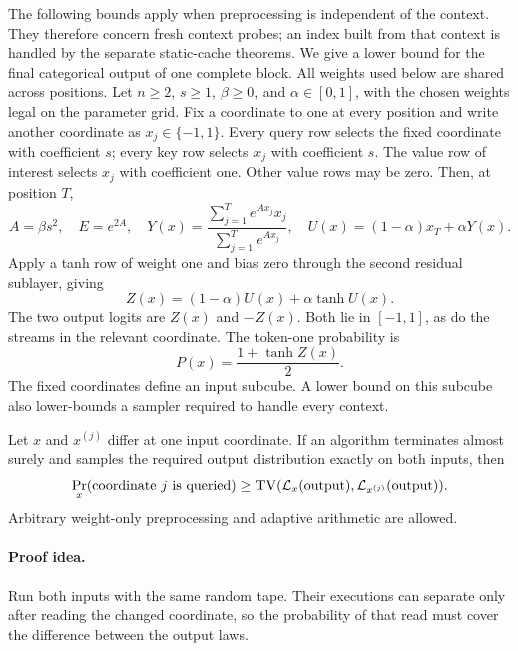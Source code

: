 The following bounds apply when preprocessing is independent of the
context. They therefore concern fresh context probes; an index built from
that context is handled by the separate static-cache theorems. We give
a lower bound for the final categorical output of one complete block.  All weights used below are shared across positions.  Let $n\ge2$,
$s\ge1$, $\beta\ge0$, and $\alpha\in[0,1]$, with the chosen weights legal
on the parameter grid.  Fix a coordinate to one at every position and
write another coordinate as $x_j\in\{-1,1\}$.  Every query row selects the
fixed coordinate with coefficient $s$; every key row selects $x_j$ with
coefficient $s$.  The value row of interest selects $x_j$ with coefficient
one.  Other value rows may be zero.  Then, at position $T$,
\begin{equation}\label{eq:binaryattentionfamily}
 A=\beta s^2,\quad E=e^{2A},\quad
 Y(x)=\frac{\sum_{j=1}^T e^{Ax_j}x_j}{\sum_{j=1}^T e^{Ax_j}},\quad
 U(x)=(1-\alpha)x_T+\alpha Y(x).
\end{equation}
Apply a tanh row of weight one and bias zero through the second residual
sublayer, giving
\[
 Z(x)=(1-\alpha)U(x)+\alpha\tanh U(x).
\]
The two output logits are $Z(x)$ and $-Z(x)$.  Both lie in $[-1,1]$, as do
the streams in the relevant coordinate.  The token-one probability is
\begin{equation}\label{eq:binaryattentiontoken}
 P(x)=\frac{1+\tanh Z(x)}2.
\end{equation}
The fixed coordinates define an input subcube.  A lower bound on this
subcube also lower-bounds a sampler required to handle every context.

\begin{lemma}\label{lem:attentioncoupling}
Let $x$ and $x^{(j)}$ differ at one input coordinate.  If an algorithm
terminates almost surely and samples the required output distribution
exactly on both inputs, then
\[
 \Pr_x(\hbox{coordinate $j$ is queried})
 \ge \operatorname{TV}(\mathcal L_x(\mathrm{output}),
                        \mathcal L_{x^{(j)}}(\mathrm{output})).
\]
Arbitrary weight-only preprocessing and adaptive arithmetic are allowed.
\end{lemma}
\paragraph{Proof idea.}
Run both inputs with the same random tape.  Their executions can separate only after reading the changed coordinate, so the probability of that read must cover the difference between the output laws.

